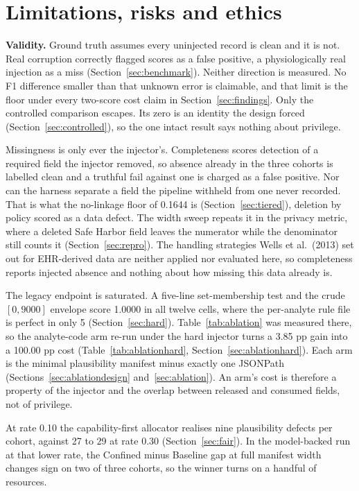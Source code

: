 \section{Limitations, risks and ethics}
\label{sec:limits}

\textbf{Validity.} Ground truth assumes every uninjected record is clean and it is not. Real
corruption correctly flagged scores as a false positive, a physiologically real injection as a miss
(Section~\ref{sec:benchmark}). Neither direction is measured. No F1 difference smaller than that
unknown error is claimable, and that limit is the floor under every two-score cost claim in
Section~\ref{sec:findings}. Only the controlled comparison escapes. Its zero is an identity the
design forced (Section~\ref{sec:controlled}), so the one intact result says nothing about privilege.

Missingness is only ever the injector's. Completeness scores detection of a required field the
injector removed, so absence already in the three cohorts is labelled clean and a truthful fail
against one is charged as a false positive. Nor can the harness separate a field the pipeline
withheld from one never recorded. That is what the no-linkage floor of 0.1644 is
(Section~\ref{sec:tiered}), deletion by policy scored as a data defect. The width sweep repeats it in
the privacy metric, where a deleted Safe Harbor field leaves the numerator while the denominator
still counts it (Section~\ref{sec:repro}). The handling strategies Wells et al.\ (2013) set out for
EHR-derived data are neither applied nor evaluated here, so completeness reports injected absence and
nothing about how missing this data already is.

The legacy endpoint is saturated. A five-line set-membership test and the crude $[0, 9000]$ envelope
score 1.0000 in all twelve cells, where the per-analyte rule file is perfect in only 5
(Section~\ref{sec:hard}). Table~\ref{tab:ablation} was measured there, so the analyte-code arm re-run
under the hard injector turns a 3.85 pp gain into a 100.00 pp cost (Table~\ref{tab:ablationhard},
Section~\ref{sec:ablationhard}). Each arm is the minimal plausibility manifest minus exactly
one JSONPath (Sections~\ref{sec:ablationdesign} and~\ref{sec:ablation}). An arm's cost is therefore a
property of the injector and the overlap between released and consumed fields, not of privilege.

At rate 0.10 the capability-first allocator realises nine plausibility defects per cohort, against
27 to 29 at rate 0.30 (Section~\ref{sec:fair}). In the model-backed run at that lower rate, the
Confined minus Baseline gap at full manifest width changes sign on two of three cohorts, so the
winner turns on a handful of resources.

